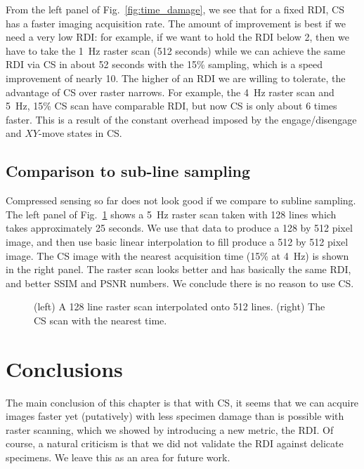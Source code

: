 \documentclass[twocolumn,oneside]{IEEEtran/IEEEtran}
\begin{document}
From the left panel of Fig.~\ref{fig:time_damage}, we see that for a fixed RDI,
CS has a faster imaging acquisition rate. The amount of improvement is best if
we need a very low RDI: for example, if we want to hold the RDI below 2, then we
have to take the 1~Hz raster scan (512 seconds) while we can achieve the same
RDI via CS in about 52 seconds with the 15\% sampling, which is a speed
improvement of nearly 10. The higher of an RDI we are willing to tolerate, the
advantage of CS over raster narrows. For example, the 4~Hz raster scan and 5~Hz,
15\% CS scan have comparable RDI, but now CS is only about 6 times faster. This
is a result of the constant overhead imposed by the engage/disengage and
$XY$-move states in CS.


\subsection{Comparison to sub-line sampling}
Compressed sensing so far does not look good if we compare to subline sampling. The left panel of Fig.~\ref{fig:subline} shows a 5~Hz raster scan taken with 128 lines which takes approximately 25 seconds. We use that data to produce a 128 by 512 pixel image, and then use basic linear interpolation to fill produce a 512 by 512 pixel image. The CS image with the nearest acquisition time (15\% at 4~Hz) is shown in the right panel. The raster scan looks better and has basically the same RDI, and better SSIM and PSNR numbers. We conclude there is no reason to use CS.
\begin{figure}
  
  \caption{(left) A 128 line raster scan interpolated onto 512 lines. (right) The CS scan with the nearest time.}
  \label{fig:subline}
\end{figure}

\section{Conclusions}\label{sec:conclusions}
The main conclusion of this chapter is that with CS, it seems that we can
acquire images faster yet (putatively) with less specimen damage than is
possible with raster scanning, which we showed by introducing a new metric, the
RDI. Of course, a natural criticism is that we did not validate the RDI against
delicate specimens. We leave this as an area for future work.








\end{document}
